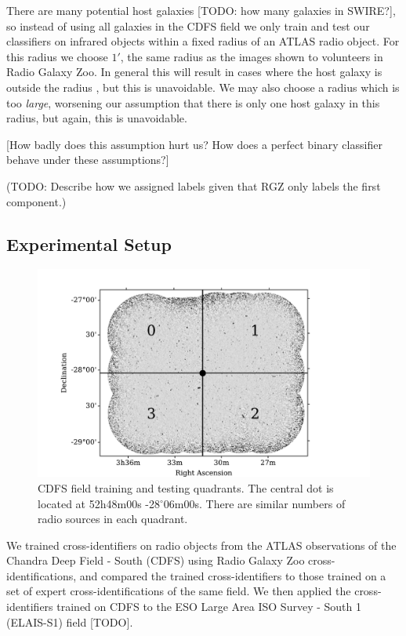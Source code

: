 \documentclass[fleqn,usenatbib,usedcolumn]{mnras}
\begin{document}
    There are many potential host galaxies {[}TODO: how many galaxies in
    SWIRE?{]}, so instead of using all galaxies in the CDFS field we only
    train and test our classifiers on infrared objects within a fixed radius
    of an ATLAS radio object. For this radius we choose \(1'\), the same
    radius as the images shown to volunteers in Radio Galaxy Zoo. In general
    this will result in cases where the host galaxy is outside the radius
    \citep[e.g. the giant radio galaxy shown in][]{banfield15}, but this is
    unavoidable. We may also choose a radius which is too \emph{large},
    worsening our assumption that there is only one host galaxy in this
    radius, but again, this is unavoidable.

    {[}How badly does this assumption hurt us? How does a perfect binary
    classifier behave under these assumptions?{]}

    (TODO: Describe how we assigned labels given that RGZ only labels the
    first component.)

  \subsection{Experimental Setup}\label{experimental-setup}

    \begin{figure}
      \centering
      \includegraphics[width=\columnwidth]{images/quadrants.pdf}
      \caption{CDFS field training and testing quadrants. The central dot is
        located at 52h48m00s -28$^\circ$06m00s. There are similar numbers of
        radio sources in each quadrant.\label{fig:quadrants}}
    \end{figure}

    We trained cross-identifiers on radio objects from the ATLAS
    observations of the Chandra Deep Field - South (CDFS) using Radio Galaxy
    Zoo cross-identifications, and compared the trained cross-identifiers to
    those trained on a set of expert cross-identifications of the same
    field. We then applied the cross-identifiers trained on CDFS to the ESO
    Large Area ISO Survey - South 1 (ELAIS-S1) field {[}TODO{]}.
\end{document}
